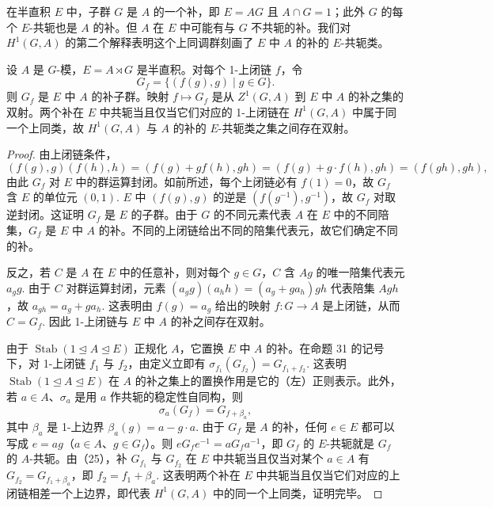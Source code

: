 在半直积 \(E\) 中，子群 \(G\) 是 \(A\) 的一个补，即 \(E = AG\) 且 \(A \cap G = 1\)；此外 \(G\) 的每个 \(E\)-共轭也是 \(A\) 的补。但 \(A\) 在 \(E\) 中可能有与 \(G\) 不共轭的补。我们对 \(H^1(G, A)\) 的第二个解释表明这个上同调群刻画了 \(E\) 中 \(A\) 的补的 \(E\)-共轭类。

\begin{proposition}\label{pro:17.33}
设 \(A\) 是 \(G\)-模，\(E = A \rtimes G\) 是半直积。对每个 1-上闭链 \(f\)，令
\[
G_f = \{(f(g), g) \mid g \in G\}.
\]
则 \(G_f\) 是 \(E\) 中 \(A\) 的补子群。映射 \(f \mapsto G_f\) 是从 \(Z^1(G, A)\) 到 \(E\) 中 \(A\) 的补之集的双射。两个补在 \(E\) 中共轭当且仅当它们对应的 1-上闭链在 \(H^1(G, A)\) 中属于同一个上同类，故 \(H^1(G, A)\) 与 \(A\) 的补的 \(E\)-共轭类之集之间存在双射。
\end{proposition}

\begin{proof}
由上闭链条件，
\[
(f(g), g)(f(h), h) = (f(g)+g f(h), gh) = (f(g)+g \cdot f(h), gh) = (f(gh), gh),
\]
由此 \(G_f\) 对 \(E\) 中的群运算封闭。如前所述，每个上闭链必有 \(f(1) = 0\)，故 \(G_f\) 含 \(E\) 的单位元 \((0,1)\). \(E\) 中 \((f(g), g)\) 的逆是 \((f(g^{-1}), g^{-1})\)，故 \(G_f\) 对取逆封闭。这证明 \(G_f\) 是 \(E\) 的子群。由于 \(G\) 的不同元素代表 \(A\) 在 \(E\) 中的不同陪集，\(G_f\) 是 \(E\) 中 \(A\) 的补。不同的上闭链给出不同的陪集代表元，故它们确定不同的补。

反之，若 \(C\) 是 \(A\) 在 \(E\) 中的任意补，则对每个 \(g \in G\)，\(C\) 含 \(Ag\) 的唯一陪集代表元 \(a_gg\). 由于 \(C\) 对群运算封闭，元素 \((a_gg)(a_hh) = (a_g+ga_h)gh\) 代表陪集 \(Agh\)，故 \(a_{gh} = a_g+ga_h\). 这表明由 \(f(g) = a_g\) 给出的映射 \(f : G \to A\) 是上闭链，从而 \(C = G_f\). 因此 1-上闭链与 \(E\) 中 \(A\) 的补之间存在双射。

由于 \(\operatorname{Stab}(1 \trianglelefteq A \trianglelefteq E)\) 正规化 \(A\)，它置换 \(E\) 中 \(A\) 的补。在命题 31 的记号下，对 1-上闭链 \(f_1\) 与 \(f_2\)，由定义立即有 \(\sigma_{f_1}(G_{f_2}) = G_{f_1+f_2}\). 这表明 \(\operatorname{Stab}(1 \trianglelefteq A \trianglelefteq E)\) 在 \(A\) 的补之集上的置换作用是它的（左）正则表示。此外，若 \(a \in A\)、\(\sigma_a\) 是用 \(a\) 作共轭的稳定性自同构，则
\[
\sigma_a(G_f) = G_{f+\beta_a}, \tag{17.25}
\]
其中 \(\beta_a\) 是 1-上边界 \(\beta_a(g) = a-g \cdot a\). 由于 \(G_f\) 是 \(A\) 的补，任何 \(e \in E\) 都可以写成 \(e = ag\)（\(a \in A\)、\(g \in G_f\)）。则 \(eG_fe^{-1} = aG_fa^{-1}\)，即 \(G_f\) 的 \(E\)-共轭就是 \(G_f\) 的 \(A\)-共轭。由（25），补 \(G_{f_1}\) 与 \(G_{f_2}\) 在 \(E\) 中共轭当且仅当对某个 \(a \in A\) 有 \(G_{f_2} = G_{f_1+\beta_a}\)，即 \(f_2 = f_1+\beta_a\). 这表明两个补在 \(E\) 中共轭当且仅当它们对应的上闭链相差一个上边界，即代表 \(H^1(G, A)\) 中的同一个上同类，证明完毕。
\end{proof}

